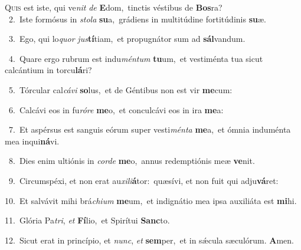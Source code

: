 \lettrine{\initial\textcolor{\initialcolor}{Q}}{uis} est iste, qui ve\textit{nit} \textit{de} \textbf{E}\-dom,~\star tinctis véstibus de \textbf{Bos}\-ra?\\
{\numbfont\textcolor{\numbcolor}{~2.}}~Iste formósus in \textit{sto}\-\textit{la} \textbf{su}\-a,~\star grádiens in multitúdine fortitúdinis \textbf{su}\-æ.\par
{\numbfont\textcolor{\numbcolor}{~3.}}~Ego, qui lo\textit{quor} \textit{jus}\-\textbf{tí}tiam,~\star et propugnátor sum ad \textbf{sál}\-vandum.\par
{\numbfont\textcolor{\numbcolor}{~4.}}~Quare ergo rubrum est indu\-\textit{mén}\-\textit{tum} \textbf{tu}\-um,~\star et vestiménta tua sicut calcántium in torcu\-\textbf{lá}\-ri?\par
{\numbfont\textcolor{\numbcolor}{~5.}}~Tórcular cal\-\textit{cá}\-\textit{vi} \textbf{so}\-lus,~\star et de Géntibus non est vir \textbf{me}\-cum:\par
{\numbfont\textcolor{\numbcolor}{~6.}}~Calcávi eos in fu\-\textit{ró}\-\textit{re} \textbf{me}\-o,~\star et conculcávi eos in ira \textbf{me}\-a:\par
{\numbfont\textcolor{\numbcolor}{~7.}}~Et aspérsus est sanguis eórum super vesti\-\textit{mén}\-\textit{ta} \textbf{me}\-a,~\star et ómnia induménta mea inqui\-\textbf{ná}\-vi.\par
{\numbfont\textcolor{\numbcolor}{~8.}}~Dies enim ultiónis in \textit{cor}\-\textit{de} \textbf{me}\-o,~\star annus redemptiónis meæ \textbf{ve}\-nit.\par
{\numbfont\textcolor{\numbcolor}{~9.}}~Circumspéxi, et non erat au\-\textit{xi}\-\textit{li}\textbf{á}tor:~\star quæsívi, et non fuit qui adju\-\textbf{vá}\-ret:\par
{\numbfont\textcolor{\numbcolor}{10.}}~Et salvávit mihi brá\-\textit{chi}\-\textit{um} \textbf{me}\-um,~\star et indignátio mea ipsa auxiliáta est \textbf{mi}\-hi.\par
{\numbfont\textcolor{\numbcolor}{11.}}~Glória Pa\-\textit{tri}\-, \textit{et} \textbf{Fí}\-lio,~\star et Spirítui \textbf{Sanc}\-to.\par
{\numbfont\textcolor{\numbcolor}{12.}}~Sicut erat in princípio, et \textit{nunc}\-, \textit{et} \textbf{sem}\-per,~\star et in sǽcula sæculórum. \textbf{A}\-men.\par
